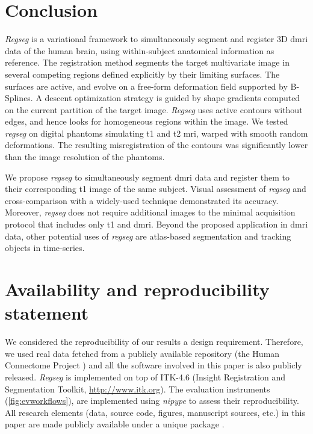 \section*{Conclusion}
\label{sec:conclusion}

\emph{Regseg} is a variational framework to simultaneously segment and
  register 3D \gls*{dmri} data of the human brain, using within-subject
  anatomical information as reference.
The registration method segments the target multivariate image in several competing regions
  defined explicitly by their limiting surfaces.
The surfaces are active, and evolve on a free-form deformation field supported by B-Splines.
A descent optimization strategy is guided by shape gradients computed on the current partition
  of the target image.
\emph{Regseg} uses active contours without edges, and hence looks for
  homogeneous regions within the image.
We tested \emph{regseg} on digital phantoms simulating \gls*{t1} and \gls*{t2} \gls*{mri},
	warped with smooth random deformations.
The resulting misregistration of the contours was significantly lower than the image resolution
  of the phantoms.

We propose \emph{regseg} to simultaneously segment \gls*{dmri} data and register them to
  their corresponding \gls*{t1} image of the same subject.
Visual assessment of \emph{regseg} and cross-comparison with a widely-used technique demonstrated 
  its accuracy.
Moreover, \emph{regseg} does not require additional images to the minimal acquisition protocol
  that includes only \gls*{t1} and \gls*{dmri}.
Beyond the proposed application in \gls*{dmri} data, other potential uses of \emph{regseg} are
  atlas-based segmentation and tracking objects in time-series.


\section*{Availability and reproducibility statement}
\label{sec:availability}
We considered the reproducibility of our results a design requirement.
Therefore, we used real data fetched from a publicly available repository
  (the Human Connectome Project \citep{essen_human_2012}) and all the software
  involved in this paper is also publicly released.
\emph{Regseg} is implemented on top of ITK-4.6 (Insight Registration and 
  Segmentation Toolkit, \url{http://www.itk.org}).
The evaluation instruments (\autoref{fig:evworkflows}), are implemented using
  \emph{nipype} \citep{gorgolewski_nipype_2011} to assess their reproducibility.
All research elements (data, source code, figures, manuscript sources, etc.) in this paper
  are made publicly available under a unique package \citep{esteban_acweregistration_2015}.